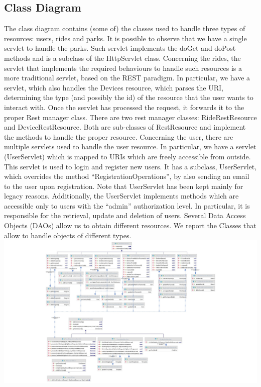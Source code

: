 \subsection{Class Diagram}

The class diagram contains (some of) the classes used to handle three types of resources: users, rides and parks. It is possible to observe that we have a single servlet to handle the parks. Such servlet implements the doGet and doPost methods and is a subclass of the HttpServlet class. Concerning the rides, the servlet that implements the required behaviours to handle such resources is a more traditional servlet, based on the REST paradigm. In particular, we have a servlet, which also handles the Devices resource, which parses the URI, determining the type (and possibly the id) of the resource that the user wants to interact with. Once the servlet has processed the request, it forwards it to the proper Rest manager class. There are two rest manager classes: RideRestResource and DeviceRestResource. Both are sub-classes of RestResource and implement the methods to handle the proper resource. Concerning the user, there are multiple servlets used to handle the user resource. In particular, we have a servlet (UserServlet) which is mapped to URIs which are freely accessible from outside. This servlet is used to login and register new users. It has a subclass, UserServlet, which overrides the method “RegistrationOperations”, by also sending an email to the user upon registration. Note that UserServlet has been kept mainly for legacy reasons. Additionally, the UserServlet implements methods which are accessible only to users with the “admin” authorization level. In particular, it is responsible for the retrieval, update and deletion of users. Several Data Access Objects (DAOs) allow us to obtain different resources. We report the Classes that allow to handle objects of different types.
\includegraphics[width=1.30\columnwidth]{WA-workflix-HW1/images/class sequence.jpg}\\

